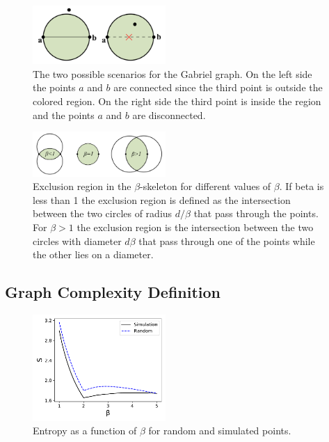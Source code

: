 \documentclass[fleqn,usenatbib]{mnras}
\begin{document}
\begin{figure}
    \centering
    \includegraphics[width=0.45\textwidth]{gabriel.pdf}
    \caption{The two possible scenarios for the Gabriel graph. On the left side the points $a$ and $b$ are connected since the third point is outside the colored region. On the right side the third point is inside the region and the points $a$ and $b$ are disconnected.}
    \label{fig:gabriel}
\end{figure}
\begin{figure}
    \centering
    \includegraphics[width=0.45\textwidth]{betaskeleton.pdf}
    \caption{Exclusion region in the $\beta$-skeleton for different values of $\beta$. If beta is less than 1 the exclusion region is defined as the intersection between the two circles of radius $d/\beta$ that pass through the points. For $\beta>1$ the exclusion region is the intersection between the two circles with diameter $d\beta$ that pass through one of the points while the other lies on a diameter.}
    \label{fig:bskeleton_area}
\end{figure}
\subsection{Graph Complexity Definition}

\begin{figure}
    \centering
    \includegraphics[width=0.45\textwidth]{svb.pdf}
    \caption{Entropy as a function of $\beta$ for random and simulated points.}
    \label{fig:svb}
\end{figure}
\end{document}
